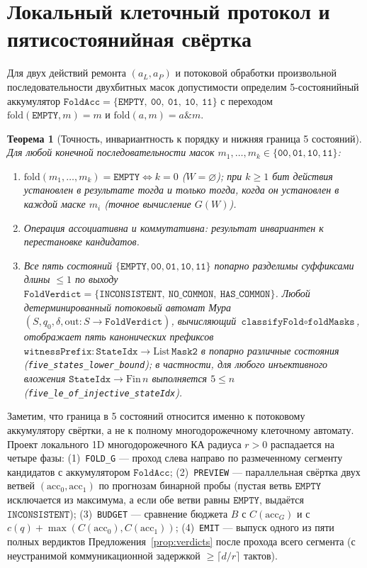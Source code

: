 \documentclass[11pt,a4paper]{article}
\theoremstyle{preprintthm}
\newtheorem{theorem}{Теорема}[section]
\theoremstyle{preprintdef}
\begin{document}
\section{Локальный клеточный протокол и пятисостоянийная свёртка}

Для двух действий ремонта $(a_L,a_P)$ и потоковой обработки произвольной последовательности двухбитных масок допустимости определим 5-состоянийный аккумулятор $\texttt{FoldAcc} = \{\texttt{EMPTY},\ \texttt{00},\ \texttt{01},\ \texttt{10},\ \texttt{11}\}$ с переходом $\mathrm{fold}(\texttt{EMPTY},m)=m$ и $\mathrm{fold}(a,m)=a\mathbin{\&}m$.

\begin{theorem}[Точность, инвариантность к порядку и нижняя граница 5 состояний]
\label{thm:fold5}
Для любой конечной последовательности масок $m_1,\dots,m_k\in\{\texttt{00},\texttt{01},\texttt{10},\texttt{11}\}$:
\begin{enumerate}
  \item $\mathrm{fold}(m_1,\dots,m_k)=\texttt{EMPTY}\iff k=0$ ($W=\varnothing$); при $k\ge 1$ бит действия установлен в результате тогда и только тогда, когда он установлен в каждой маске $m_i$ (точное вычисление $G(W)$).
  \item Операция ассоциативна и коммутативна: результат инвариантен к перестановке кандидатов.
  \item Все пять состояний $\{\texttt{EMPTY},\texttt{00},\texttt{01},\texttt{10},\texttt{11}\}$ попарно разделимы суффиксами длины $\le 1$ по выходу $\texttt{FoldVerdict}=\{\texttt{INCONSISTENT},\ \texttt{NO\_COMMON},\ \texttt{HAS\_COMMON}\}$. Любой детерминированный потоковый автомат Мура $(S,q_0,\delta,\mathrm{out}:S\to\texttt{FoldVerdict})$, вычисляющий $\texttt{classifyFold}\circ\texttt{foldMasks}$, отображает пять канонических префиксов $\texttt{witnessPrefix}:\texttt{StateIdx}\to\mathrm{List}\,\texttt{Mask2}$ в попарно различные состояния (\texttt{five\_states\_lower\_bound}); в частности, для любого инъективного вложения $\texttt{StateIdx}\to\mathrm{Fin}\,n$ выполняется $5\le n$ (\texttt{five\_le\_of\_injective\_stateIdx}).
\end{enumerate}
\end{theorem}

Заметим, что граница в 5 состояний относится именно к потоковому аккумулятору свёртки, а не к полному многодорожечному клеточному автомату. Проект локального 1D многодорожечного КА радиуса $r>0$ распадается на четыре фазы: (1)~\texttt{FOLD\_G} --- проход слева направо по размеченному сегменту кандидатов с аккумулятором $\texttt{FoldAcc}$; (2)~\texttt{PREVIEW} --- параллельная свёртка двух ветвей $(\mathrm{acc}_0,\mathrm{acc}_1)$ по прогнозам бинарной пробы (пустая ветвь $\texttt{EMPTY}$ исключается из максимума, а если обе ветви равны $\texttt{EMPTY}$, выдаётся $\texttt{INCONSISTENT}$); (3)~\texttt{BUDGET} --- сравнение бюджета $B$ с $C(\mathrm{acc}_G)$ и с $c(q)+\max(C(\mathrm{acc}_0),C(\mathrm{acc}_1))$; (4)~\texttt{EMIT} --- выпуск одного из пяти полных вердиктов Предложения~\ref{prop:verdicts} после прохода всего сегмента (с неустранимой коммуникационной задержкой $\ge \lceil d/r\rceil$ тактов).
\end{document}
